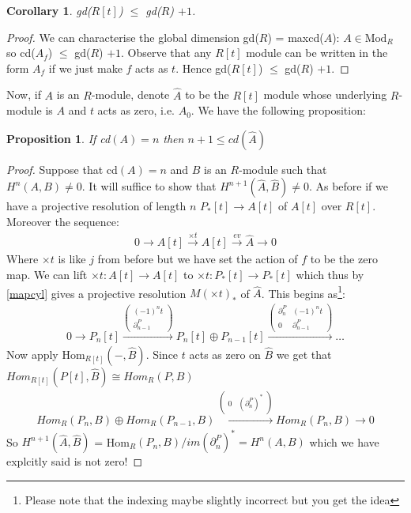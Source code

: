 \documentclass[12pt]{book}
\newtheorem{proposition}[theorem]{Proposition}
\newtheorem{corollary}[theorem]{Corollary}
\theoremstyle{definition}
\begin{document}
\begin{corollary}\label{Hilbert2}
    gd($R[t]$) $\leq$ gd($R$) $ + 1$. 
\end{corollary}
\begin{proof}
    We can characterise the global dimension gd($R$) = max{cd($A$): $A \in \text{Mod}_R$} so cd($A_f$) $\leq$ gd($R$) $ + 1$. Observe that any $R[t]$ module can be written in the form $A_f$ if we just make $f$ acts as $t$. Hence gd($R[t]$) $ \leq$ gd($R$) $ + 1$. 
\end{proof}

Now, if $A$ is an $R$-module, denote $\hat{A}$ to be the $R[t]$ module whose underlying $R$-module is $A$ and $t$ acts as zero, i.e. $A_0$. We have the following proposition: 

\begin{proposition}
    If cd$(A) = n$ then $n + 1 \leq cd(\hat{A})$
\end{proposition}
\begin{proof}
    Suppose that cd$(A) = n$ and $B$ is an $R$-module such that $H^n(A,B) \neq 0$. It will suffice to show that $H^{n+1}(\hat{A}, \hat{B}) \neq 0$. As before if we have a projective resolution of length $n$ $P_*[t] \to A[t]$ of $A[t]$ over $R[t]$. Moreover the sequence: 
    \begin{align*}
        0 \rightarrow A[t] \xrightarrow{\times t} A[t] \xrightarrow{ev} \hat{A} \rightarrow 0 
    \end{align*} 
    Where $\times t$ is like $j$ from before but we have set the action of $f$ to be the zero map. We can lift $\times t: A[t] \to A[t]$ to $\times t: P_*[t] \to P_*[t]$ which thus by \ref{mapcyl} gives a projective resolution $M(\times t)_*$ of $\hat{A}$. This begins as\footnote{Please note that the indexing maybe slightly incorrect but you get the idea}: 
    \begin{align*}
        0 \rightarrow P_n[t] \xrightarrow{\left(\begin{smallmatrix}(-1)^n t \\ \partial^P_{n-1} \end{smallmatrix}\right)} P_n[t] \oplus P_{n-1}[t] \xrightarrow{\left(\begin{smallmatrix}\partial^P_n & (-1)^n t \\ 0 & \partial^P_{n-1} \end{smallmatrix}\right)} \dots 
    \end{align*}
Now apply Hom$_{R[t]}(-, \hat{B})$. Since $t$ acts as zero on $\hat{B}$ we get that $Hom_{R[t]}(P[t], \hat{B}) \cong Hom_R(P,B)$ 
\begin{align*}
    Hom_R(P_n, B) \oplus Hom_R(P_{n-1}, B) \xrightarrow{\left( \begin{smallmatrix} 0 & (\partial^P_n)^*\end{smallmatrix} \right)} Hom_R(P_n, B) \rightarrow 0 
\end{align*}
So $H^{n+1}(\hat{A}, \hat{B})$ = Hom$_R(P_n, B)/im(\partial^P_n)^* = H^n(A,B)$ which we have explcitly said is not zero!
\end{proof}
\end{document}
